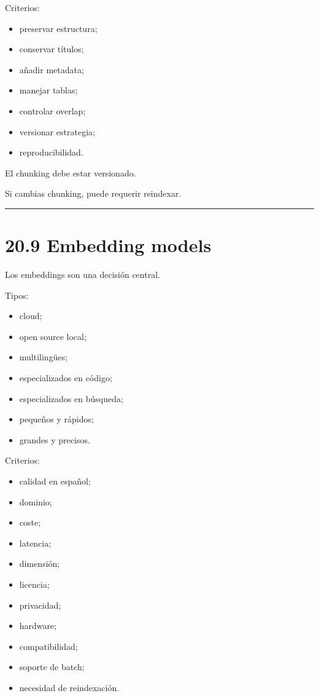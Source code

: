 Criterios:

\begin{itemize}
\tightlist
\item
  preservar estructura;
\item
  conservar títulos;
\item
  añadir metadata;
\item
  manejar tablas;
\item
  controlar overlap;
\item
  versionar estrategia;
\item
  reproducibilidad.
\end{itemize}

El chunking debe estar versionado.

Si cambias chunking, puede requerir reindexar.

\begin{center}\rule{0.5\linewidth}{0.5pt}\end{center}

\section{20.9 Embedding models}\label{embedding-models}

Los embeddings son una decisión central.

Tipos:

\begin{itemize}
\tightlist
\item
  cloud;
\item
  open source local;
\item
  multilingües;
\item
  especializados en código;
\item
  especializados en búsqueda;
\item
  pequeños y rápidos;
\item
  grandes y precisos.
\end{itemize}

Criterios:

\begin{itemize}
\tightlist
\item
  calidad en español;
\item
  dominio;
\item
  coste;
\item
  latencia;
\item
  dimensión;
\item
  licencia;
\item
  privacidad;
\item
  hardware;
\item
  compatibilidad;
\item
  soporte de batch;
\item
  necesidad de reindexación.
\end{itemize}

